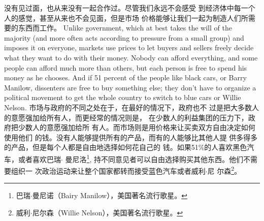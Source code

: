 \begin{paracol}{2}
没有见过面，也从来没有一起合作过。尽管我们永远不会感受
到经济体中每一个人的感觉，甚至从来也不会见面，但是市场
价格能够让我们一起为制造人们所需要的东西而工作。
\switchcolumn*
Unlike government, which at best takes the will of the majority (and more often acts according to pressure from a small
group) and imposes it on everyone, markets use prices to let
buyers and sellers freely decide what they want to do with their
money. Nobody can afford everything, and some people can afford much more than others, but each person is free to spend his
money as he chooses. And if 51 percent of the people like black
cars, or Barry Manilow, dissenters are free to buy something
else; they don't have to organize a political movement to get
the whole country to switch to blue cars or Willie Nelson.
\switchcolumn
市场与政府的不同之处在于，在最好的情况下，政府也不
过是把大多数人的意愿强加给所有人，而更经常的情况则是，
在少数人的利益集团的压力下，政府把少数人的意愿强加给所
有人。而市场则是用价格来让买卖双方自由决定如何使用他们
的钱。没有人能够提供所有的产品，而有的人能够比其他人提
供多得多的产品，但是每个人都是自由地选择如何花自己的
钱。如果51\%的人喜欢黑色汽车，或者喜欢巴瑞$\cdot$ 曼尼洛\footnote{巴瑞$\cdot$曼尼诺（Bairy Manilow），美国著名流行歌星。},
持不同意见者可以自由选择购买其他东西。他们不需要组织一
次政治运动来让整个国家都转而接受蓝色汽车或者威利$\cdot$尼
尔森\footnote{威利$\cdot$尼尔森（Willie Nelson），美国著名流行歌星。}。


\end{paracol}
